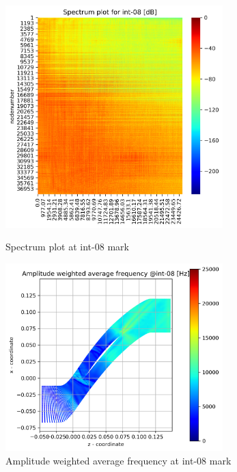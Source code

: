\begin{figure}[ht]
  \centering
  \includegraphics[width=0.75\textwidth]{Figures/int-08_spectrum.png}
  \caption{Spectrum plot at int-08 mark} \label{int-08-spectrum}
  
  \vspace*{\floatsep}%

  \includegraphics[width=0.75\textwidth]{Figures/int-08-awaf.png}
  \caption{Amplitude weighted average frequency at int-08 mark} \label{int-08-awaf}
\end{figure}

